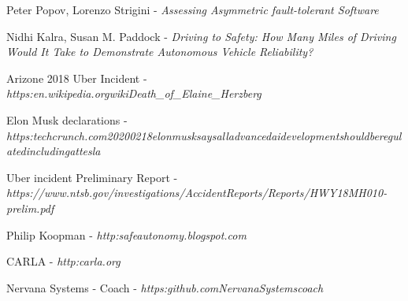 \begin{thebibliography}{9}

Peter Popov, Lorenzo Strigini - \textit{Assessing Asymmetric fault-tolerant Software}

Nidhi Kalra, Susan M. Paddock - \textit{Driving to Safety: How Many Miles of Driving Would It Take to Demonstrate Autonomous Vehicle Reliability?}

Arizone 2018 Uber Incident - 
\textit{https:\/\/en.wikipedia.org\/wiki\/Death\_of\_Elaine\_Herzberg}

Elon Musk declarations - \textit{https:\/\/techcrunch.com\/2020\/02\/18\/elon\-musk\-says\-all\-advanced\-ai\-development\-should\-be\-regulated\-including\-at\-tesla}

Uber incident Preliminary Report - \textit{https://www.ntsb.gov/investigations/AccidentReports/Reports/HWY18MH010-prelim.pdf}

Philip Koopman - \textit{http:\/\/safeautonomy.blogspot.com\/}

CARLA - \textit{http:\/\/carla.org\/}

Nervana Systems - Coach - \textit{https:\/\/github.com\/NervanaSystems\/coach}

\end{thebibliography}